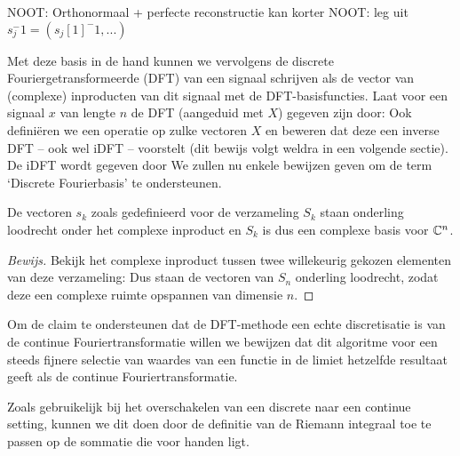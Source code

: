 NOOT: Orthonormaal + perfecte reconstructie kan korter 
NOOT: leg uit $s_j^-1 = (s_j[1]^-1,...)$

Met deze basis in de hand kunnen we vervolgens de discrete Fouriergetransformeerde (DFT) van een signaal schrijven als de vector van (complexe) inproducten van dit signaal met de DFT-basisfuncties. Laat voor een signaal $x$ van lengte $n$ de DFT (aangeduid met $X$) gegeven zijn door:
Ook defini\"eren we een operatie op zulke vectoren $X$ en beweren dat deze een inverse DFT -- ook wel iDFT -- voorstelt (dit bewijs volgt weldra in een volgende sectie). De iDFT wordt gegeven door
We zullen nu enkele bewijzen geven om de term `Discrete Fourierbasis' te ondersteunen.

\begin{stelling}[Fourierbasis]
  De vectoren $s_k$ zoals gedefinieerd voor de verzameling $S_k$ staan onderling loodrecht onder het complexe
  inproduct en $S_k$ is dus een complexe basis voor $\mathbb{C}^n$.
\end{stelling}
\begin{proof}[Bewijs]
  Bekijk het complexe inproduct tussen twee willekeurig gekozen elementen van deze verzameling:
  Dus staan de vectoren van $S_n$ onderling loodrecht, zodat deze een complexe ruimte opspannen van dimensie $n$.
\end{proof}

Om de claim te ondersteunen dat de DFT-methode een echte discretisatie is van de continue Fouriertransformatie willen we bewijzen dat dit algoritme voor een steeds fijnere selectie van waardes van een functie in de limiet hetzelfde resultaat geeft als de continue Fouriertransformatie. 

Zoals gebruikelijk bij het overschakelen van een discrete naar een continue setting, kunnen we dit doen 
door de definitie van de Riemann integraal toe te passen op de sommatie die voor handen ligt.

